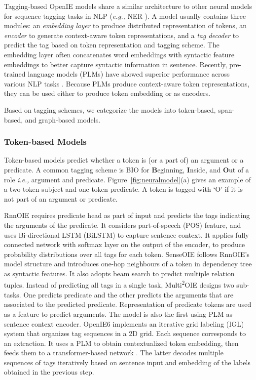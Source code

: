 \documentclass{article}
\newcommand{\ie}{\emph{i.e.,}\xspace}
\newcommand{\eg}{\emph{e.g.,}\xspace}
\begin{document}
Tagging-based OpenIE models share a similar architecture to other neural models for sequence tagging tasks in NLP (\eg NER \cite{li2020survey}). A model usually contains three modules: an \textit{embedding layer} to produce distributed representation of tokens, an \textit{encoder} to generate context-aware token representations, and a \textit{tag decoder} to predict the tag based on token representation and tagging scheme. The embedding layer often concatenates word embeddings with syntactic feature embeddings to better capture syntactic information in sentence. Recently, pre-trained language models (PLMs) have showed superior performance across various NLP tasks \cite{devlin-etal-2019-bert}. Because PLMs produce context-aware token representations, they can be used either to produce token embedding or as encoders.

Based on tagging schemes, we categorize the models into token-based, span-based, and graph-based models.

\subsubsection{Token-based Models}
Token-based models predict whether a token is (or a part of) an argument or a predicate. A common tagging scheme is BIO for \textbf{B}eginning, \textbf{I}nside, and \textbf{O}ut of a role \ie argument and predicate. Figure~\ref{fig:neuralmodel}(a) gives an example of a two-token subject and one-token predicate. A token is tagged with `O' if it is not part of an argument or predicate.

RnnOIE \cite{stanovsky-etal-2018-supervised} requires predicate head as part of input and predicts the tags indicating the arguments of the predicate. It considers part-of-speech (POS) feature, and uses Bi-directional LSTM (BiLSTM) \cite{Srivastava2015TrainingVD} to capture sentence context. It applies fully connected network with softmax layer on the output of the encoder, to produce probability distributions over all tags for each token. SenseOIE \cite{roy-etal-2019-supervising} follows RnnOIE's model structure and introduces one-hop neighbours of a token in dependency tree as syntactic features. It also adopts beam search to predict multiple relation tuples. Instead of predicting all tags in a single task, Multi\textsuperscript{2}OIE \cite{ro-etal-2020-multi} designs two sub-tasks. One predicts predicate and the other predicts the arguments that are associated to the predicted predicate. Representation of predicate tokens are used as a feature to predict arguments. The model is also the first  using PLM as sentence context encoder. OpenIE6 \cite{kolluru-etal-2020-openie6} implements an iterative grid labeling (IGL) system that organizes tag sequences in a 2D grid. Each sequence corresponds to an extraction. It uses a PLM to obtain contextualized token embedding, then feeds them to a transformer-based network \cite{vaswani-2017-attention}. The latter decodes multiple sequences of tags iteratively based on sentence input and embedding of the labels obtained in the previous step.
\end{document}
